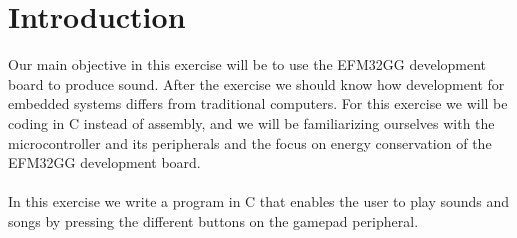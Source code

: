 \chapter{Introduction}
Our main objective in this exercise will be to use the EFM32GG development board to produce sound. After the exercise we should know how development for embedded systems differs from traditional computers. For this exercise we will be coding in C instead of assembly, and we will be familiarizing ourselves with the microcontroller and its peripherals and the focus on energy conservation of the EFM32GG development board. 
\\
\\
In this exercise we write a program in C that enables the user to play sounds and songs by pressing the different buttons on the gamepad peripheral. 

